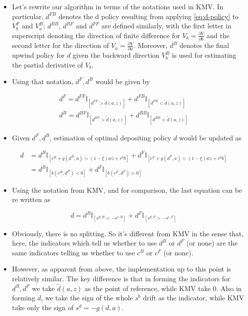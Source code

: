 \documentclass[11pt]{article}
\begin{document}
\begin{itemize}
\item Let's rewrite our algorithm in terms of the notations used in KMV. In particular, \(d^{FB}\) denotes the d policy resulting from applying \eqref{eq:d-policy} to \(V_b^F\) and \(V_a^B\); \(d^{BB}\), \(d^{BF}\) and \(d^{FF}\) are defined similarly, with the first letter in superscript denoting the direction of finite difference for \(V_b = \frac{\partial V}{\partial b}\) and the second letter for the direction of \(V_a = \frac{\partial V}{\partial a}\). Moreover, \(d^B\) denotes the final upwind policy for \(d\) given the backward direction \(V_b^B\) is used for estimating the partial derivative of \(V_{b}\).
\item Using that notation, \(d^F, d^B\) would be given by
\end{itemize}
\begin{align*}
d^F = d^{FF} \mathbb{I}_{\left[d^{FF} > \tilde{d}(a,z) \right]} + d^{FB} \mathbb{I}_{\left[d^{FB} < \tilde{d}(a,z) \right]}\\
d^B = d^{BF} \mathbb{I}_{\left[d^{BF} > \tilde{d}(a,z) \right]} + d^{BB} \mathbb{I}_{\left[d^{BB} < \tilde{d}(a,z) \right]}
\end{align*}
\begin{itemize}
\item Given \(d^F, d^B\), estimation of optimal depositing policy \(d\) would be updated as
\end{itemize}
\begin{align*}
d &= d^B \mathbb{I}_{\left[ c^B + g(d^B,a) > (1-\xi) w z + r^bb \right]} + d^F \mathbb{I}_{\left[ c^F + g(d^F,a) < (1-\xi) w z + r^bb \right]} \\
&= d^B \mathbb{I}_{\left[ \dot{b} \left(c^B, d^B\right) < 0 \right]} + d^F \mathbb{I}_{\left[ \dot{b} \left(c^F, d^F\right) > 0 \right]}
\end{align*}
\begin{itemize}
\item Using the notation from KMV, and for comparison, the last equation can be re written as
\end{itemize}
\[ d = d^B \mathbb{I}_{\left[s^{d,B}<-s^{c,B}  \right]} + d^F \mathbb{I}_{\left[ s^{d,F} > -s^{c,F} \right]}  \]

\begin{itemize}
\item Obviously, there is no splitting. So it's different from KMV in the sense that, here, the indicators which tell us whether to use \(d^B\) or \(d^F\) (or none) are the same indicators telling us whether to use \(c^B\) or \(c^F\) (or none).

\item However, as apparent from above, the implementation up to this point is relatively similar. The key difference is that in forming the indicators for \(d^B, d^F\) we take \(\tilde{d}(a,z)\) as the point of reference, while KMV take 0. Also in forming \(d\), we take the sign of the whole \(s^b\) drift as the indicator, while KMV take only the sign of \(s^d = -g(d,a)\).
\end{itemize}
\end{document}
